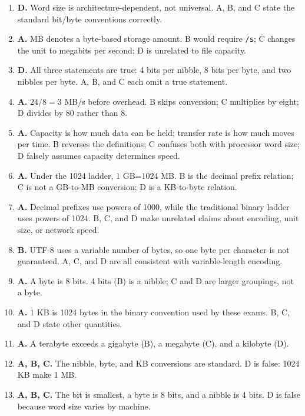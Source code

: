 \documentclass[11pt]{article}
\begin{document}
\begin{enumerate}[label=\textbf{Q\arabic*.}, leftmargin=*]
  character.
\item \textbf{D.} Word size is architecture-dependent, not universal. A, B,
  and C state the standard bit/byte conventions correctly.
\item \textbf{A.} MB denotes a byte-based storage amount. B would require
  \texttt{/s}; C changes the unit to megabits per second; D is unrelated to
  file capacity.
\item \textbf{D.} All three statements are true: 4 bits per nibble, 8 bits
  per byte, and two nibbles per byte. A, B, and C each omit a true statement.
\item \textbf{A.} $24/8=3$ MB/s before overhead. B skips conversion; C
  multiplies by eight; D divides by 80 rather than 8.
\item \textbf{A.} Capacity is how much data can be held; transfer rate is
  how much moves per time. B reverses the definitions; C confuses both with
  processor word size; D falsely assumes capacity determines speed.
\item \textbf{A.} Under the 1024 ladder, $1$ GB=$1024$ MB. B is the decimal
  prefix relation; C is not a GB-to-MB conversion; D is a KB-to-byte
  relation.
\item \textbf{A.} Decimal prefixes use powers of 1000, while the traditional
  binary ladder uses powers of 1024. B, C, and D make unrelated claims about
  encoding, unit size, or network speed.
\item \textbf{B.} UTF-8 uses a variable number of bytes, so one byte per
  character is not guaranteed. A, C, and D are all consistent with
  variable-length encoding.

\item \textbf{A.} A byte is 8 bits. 4 bits (B) is a nibble; C and D are larger groupings, not a byte.
\item \textbf{A.} 1 KB is 1024 bytes in the binary convention used by these exams. B, C, and D state other quantities.
\item \textbf{A.} A terabyte exceeds a gigabyte (B), a megabyte (C), and a kilobyte (D).
\item \textbf{A, B, C.} The nibble, byte, and KB conversions are standard. D is false: 1024 KB make 1 MB.
\item \textbf{A, B, C.} The bit is smallest, a byte is 8 bits, and a nibble is 4 bits. D is false because word size varies by machine.
\end{enumerate}
\def\JKSSBLessonID{3}\def\JKSSBAnswers{1}
\end{document}
